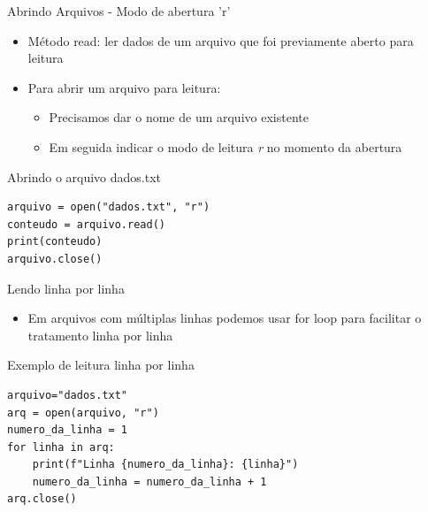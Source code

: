 \begin{frame}[fragile]{Abrindo Arquivos - Modo de abertura 'r'}
\begin{itemize}
    \item Método read: ler dados de um arquivo que foi previamente aberto para leitura
    \item Para abrir um arquivo para leitura: 
    \begin{itemize}
        \item Precisamos dar o nome de um arquivo existente 
        \item Em seguida indicar o modo de leitura \textit{r} no momento da abertura
    \end{itemize}

\end{itemize}

\begin{block}{Abrindo o arquivo dados.txt}
\begin{verbatim}
arquivo = open("dados.txt", "r")
conteudo = arquivo.read()
print(conteudo)
arquivo.close()
\end{verbatim}
\end{block}

\end{frame}



\begin{frame}[fragile]{Lendo linha por linha}

\begin{itemize}
    \item Em arquivos com múltiplas linhas podemos usar for loop para facilitar o tratamento linha por linha
\end{itemize}
    
\begin{exampleblock}{Exemplo de leitura linha por linha}
\begin{verbatim}
arquivo="dados.txt"
arq = open(arquivo, "r")
numero_da_linha = 1
for linha in arq:
    print(f"Linha {numero_da_linha}: {linha}")
    numero_da_linha = numero_da_linha + 1
arq.close()
\end{verbatim}
\end{exampleblock}


\end{frame}


